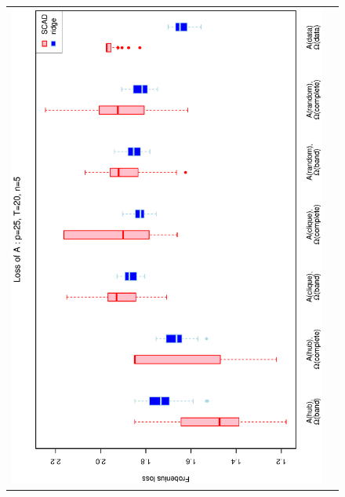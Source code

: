 \begin{figure}[h!]
\centering
\begin{tabular}{cc}
\includegraphics[scale=0.45,angle=270]{LossA25T20N5_5.eps}
\\

\end{tabular}
\end{figure}
